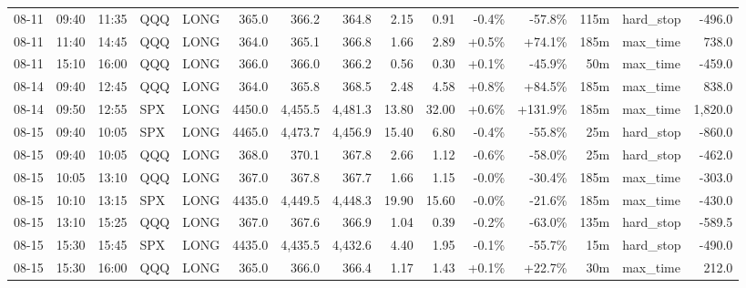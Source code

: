 \documentclass[11pt,a4paper,twoside]{article}
\begin{document}
\begin{landscape}
\begin{center}
\begin{longtable}{>{\color{txtmain}}l l l l l r r r r r r r r >{\color{txtmain}}l r}
08-11 & 09:40 & 11:35 & QQQ & LONG & 365.0 & 366.2 & 364.8 & 2.15 & 0.91 & \textcolor{lossred}{-0.4\%} & \textcolor{lossred}{-57.8\%} & 115m & hard\_stop & \textcolor{lossred}{-496.0} \\
08-11 & 11:40 & 14:45 & QQQ & LONG & 364.0 & 365.1 & 366.8 & 1.66 & 2.89 & \textcolor{wingreen}{+0.5\%} & \textcolor{wingreen}{+74.1\%} & 185m & max\_time & \textcolor{wingreen}{738.0} \\
08-11 & 15:10 & 16:00 & QQQ & LONG & 366.0 & 366.0 & 366.2 & 0.56 & 0.30 & \textcolor{wingreen}{+0.1\%} & \textcolor{lossred}{-45.9\%} & 50m & max\_time & \textcolor{lossred}{-459.0} \\
08-14 & 09:40 & 12:45 & QQQ & LONG & 364.0 & 365.8 & 368.5 & 2.48 & 4.58 & \textcolor{wingreen}{+0.8\%} & \textcolor{wingreen}{+84.5\%} & 185m & max\_time & \textcolor{wingreen}{838.0} \\
08-14 & 09:50 & 12:55 & SPX & LONG & 4450.0 & 4,455.5 & 4,481.3 & 13.80 & 32.00 & \textcolor{wingreen}{+0.6\%} & \textcolor{wingreen}{+131.9\%} & 185m & max\_time & \textcolor{wingreen}{1,820.0} \\
08-15 & 09:40 & 10:05 & SPX & LONG & 4465.0 & 4,473.7 & 4,456.9 & 15.40 & 6.80 & \textcolor{lossred}{-0.4\%} & \textcolor{lossred}{-55.8\%} & 25m & hard\_stop & \textcolor{lossred}{-860.0} \\
08-15 & 09:40 & 10:05 & QQQ & LONG & 368.0 & 370.1 & 367.8 & 2.66 & 1.12 & \textcolor{lossred}{-0.6\%} & \textcolor{lossred}{-58.0\%} & 25m & hard\_stop & \textcolor{lossred}{-462.0} \\
08-15 & 10:05 & 13:10 & QQQ & LONG & 367.0 & 367.8 & 367.7 & 1.66 & 1.15 & \textcolor{lossred}{-0.0\%} & \textcolor{lossred}{-30.4\%} & 185m & max\_time & \textcolor{lossred}{-303.0} \\
08-15 & 10:10 & 13:15 & SPX & LONG & 4435.0 & 4,449.5 & 4,448.3 & 19.90 & 15.60 & \textcolor{lossred}{-0.0\%} & \textcolor{lossred}{-21.6\%} & 185m & max\_time & \textcolor{lossred}{-430.0} \\
08-15 & 13:10 & 15:25 & QQQ & LONG & 367.0 & 367.6 & 366.9 & 1.04 & 0.39 & \textcolor{lossred}{-0.2\%} & \textcolor{lossred}{-63.0\%} & 135m & hard\_stop & \textcolor{lossred}{-589.5} \\
08-15 & 15:30 & 15:45 & SPX & LONG & 4435.0 & 4,435.5 & 4,432.6 & 4.40 & 1.95 & \textcolor{lossred}{-0.1\%} & \textcolor{lossred}{-55.7\%} & 15m & hard\_stop & \textcolor{lossred}{-490.0} \\
08-15 & 15:30 & 16:00 & QQQ & LONG & 365.0 & 366.0 & 366.4 & 1.17 & 1.43 & \textcolor{wingreen}{+0.1\%} & \textcolor{wingreen}{+22.7\%} & 30m & max\_time & \textcolor{wingreen}{212.0} \\

\end{longtable}
\end{center}
\end{landscape}
\end{document}
